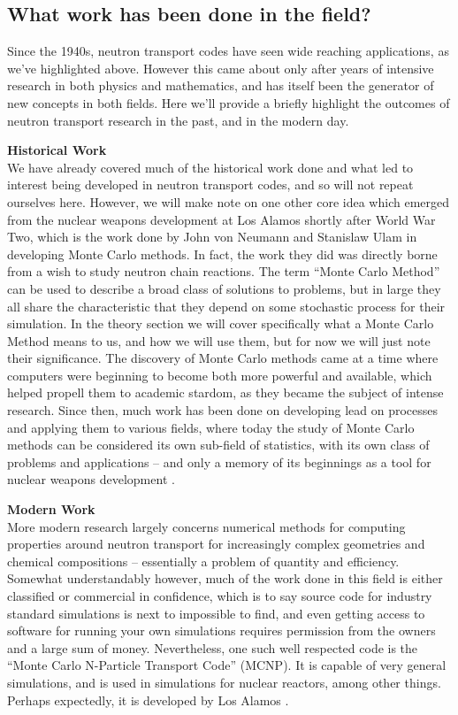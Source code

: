 \subsection{What work has been done in the field?}

Since the 1940s, neutron transport codes have seen wide reaching applications, as we've highlighted above. However this came about only 
after years of intensive research in both physics and mathematics, and has itself been the generator of new concepts in both fields. 
Here we'll provide a briefly highlight the outcomes of neutron transport research in the past, and in the modern day.

\noindent\textbf{Historical Work}\\
We have already covered much of the historical work done and what led to interest being developed in neutron transport codes, and so 
will not repeat ourselves here. However, we will make note on one other core idea which emerged from the nuclear weapons development 
at Los Alamos shortly after World War Two, which is the work done by John von Neumann and Stanislaw Ulam in developing 
Monte Carlo methods. In fact, the work they did was directly borne from a wish to study neutron chain reactions. 
The term ``Monte Carlo Method'' can be used to describe a broad class of solutions to problems, but in large they all share 
the characteristic that they depend on some stochastic process for their simulation. In the theory section we will cover specifically 
what a Monte Carlo Method means to us, and how we will use them, but for now we will just note their significance. The discovery 
of Monte Carlo methods came at a time where computers were beginning to become both more powerful and available, which 
helped propell them to academic stardom, as they became the subject of intense research. Since then, much work has been done 
on developing lead on processes and applying them to various fields, where today the study of Monte Carlo methods can be considered 
its own sub-field of statistics, with its own class of problems and applications -- and only a memory of its beginnings 
as a tool for nuclear weapons development \cite{dirk-monte-carlo}.


\noindent\textbf{Modern Work}\\
More modern research largely concerns numerical methods for computing properties around neutron transport for increasingly complex 
geometries and chemical compositions -- essentially a problem of quantity and efficiency. Somewhat understandably however, 
much of the work done in this field is either classified or commercial in confidence, which is to say source code for industry 
standard simulations is next to impossible to find, and even getting access to software for running your own simulations 
requires permission from the owners and a large sum of money. Nevertheless, one such well respected code is the ``Monte Carlo N-Particle 
Transport Code'' (MCNP). It is capable of very general simulations, and is used in simulations 
for nuclear reactors, among other things. Perhaps expectedly, it is developed by Los Alamos \cite{mcnp-code}. 

